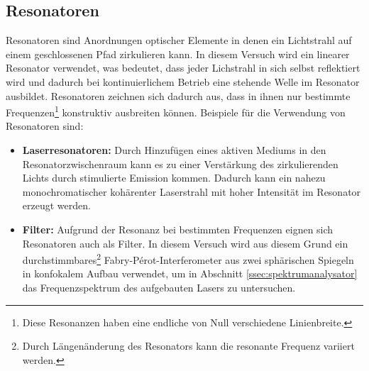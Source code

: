 \documentclass[11pt, a4paper]{article}
\numberwithin{equation}{section}
\begin{document}
\subsection{Resonatoren}
Resonatoren sind Anordnungen optischer Elemente in denen ein Lichtstrahl auf einem geschlossenen Pfad zirkulieren kann.
In diesem Versuch wird ein linearer Resonator verwendet, was bedeutet, dass jeder Lichstrahl in sich selbst reflektiert wird und dadurch bei kontinuierlichem Betrieb eine stehende Welle im Resonator ausbildet.
Resonatoren zeichnen sich dadurch aus, dass in ihnen nur bestimmte Frequenzen\footnote{Diese Resonanzen haben eine endliche von Null verschiedene Linienbreite.} konstruktiv ausbreiten können.
Beispiele für die Verwendung von Resonatoren sind:
\begin{itemize}
	\item \textbf{Laserresonatoren:} Durch Hinzufügen eines aktiven Mediums in den Resonatorzwischenraum kann es zu einer Verstärkung des zirkulierenden Lichts durch stimulierte Emission kommen.
	Dadurch kann ein nahezu monochromatischer kohärenter Laserstrahl mit hoher Intensität im Resonator erzeugt werden.	
	
	\item \textbf{Filter:} Aufgrund der Resonanz bei bestimmten Frequenzen eignen sich Resonatoren auch als Filter.
	In diesem Versuch wird aus diesem Grund ein durchstimmbares\footnote{Durch Längenänderung des Resonators kann die resonante Frequenz variiert werden.} Fabry-Pérot-Interferometer aus zwei sphärischen Spiegeln in konfokalem Aufbau verwendet, um in Abschnitt \ref{ssec:spektrumanalysator} das Frequenzspektrum des aufgebauten Lasers zu untersuchen.
\end{itemize}
\end{document}

